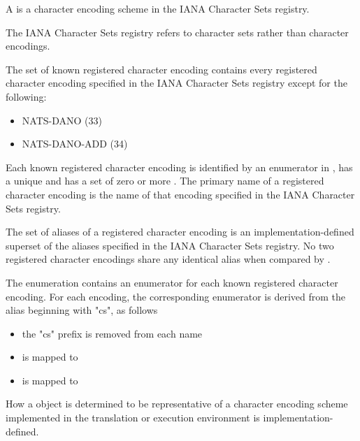 \documentclass{wg21}
\begin{document}
\begin{addedblock}

\pnum A  is a character encoding scheme in the IANA Character Sets registry.
\begin{note}
    The IANA Character Sets registry refers to character sets rather than character encodings.
\end{note}



The set of known registered character encoding contains every registered character encoding specified in the IANA Character Sets registry except for the following:
\begin{itemize}
\item NATS-DANO (33)
\item NATS-DANO-ADD	(34)
\end{itemize}

Each known registered character encoding is identified by an enumerator in , has a unique  and has a set of zero or more .
The primary name of a registered character encoding is the name of that encoding specified in the IANA Character Sets registry.


The set of aliases of a registered character encoding is an implementation-defined superset of the aliases specified in the IANA Character Sets registry.
No two registered character encodings share any identical alias when compared by .

\begin{note}
The  enumeration contains an enumerator for each known registered character encoding.
For each encoding, the corresponding enumerator is derived from the alias beginning with "cs", as follows
\begin{itemize}
    \item the "cs" prefix is removed from each name
    \item {} is mapped to 
    \item {} is mapped to 
    \end{itemize}
\end{note}

How a  object is determined to be representative of a character encoding scheme implemented in the translation or execution environment is implementation-defined.


\end{addedblock}
\end{document}
